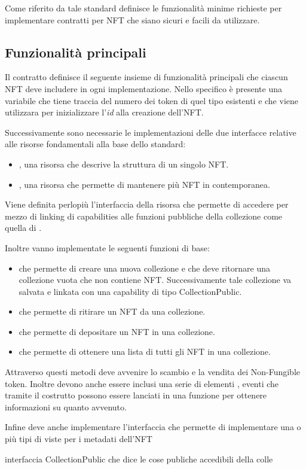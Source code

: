 Come riferito da \cite{web:nft} tale standard definisce le funzionalità minime richieste per implementare contratti per NFT che siano sicuri e facili da utilizzare.

\subsection{Funzionalità principali}
Il contratto definisce il seguente insieme di funzionalità principali che ciascun NFT deve includere in ogni implementazione. Nello specifico è presente una variabile  che tiene traccia del numero dei token di quel tipo esistenti e che viene utilizzara per inizializzare l'\textit{id} alla creazione dell'NFT.

Successivamente sono necessarie le implementazioni delle due interfacce relative alle risorse fondamentali alla base dello standard:
\begin{itemize}
    \item {}, una risorsa che descrive la struttura di un singolo NFT.
    \item {}, una risorsa che permette di mantenere più NFT in contemporanea.
\end{itemize}

Viene definita perlopiù l'interfaccia della risorsa  che permette di accedere per mezzo di linking di capabilities alle funzioni pubbliche della collezione come quella di .

Inoltre vanno implementate le seguenti funzioni di base:
\begin{itemize}
    \item {} che permette di creare una nuova collezione e che deve ritornare una collezione vuota che non contiene NFT. Successivamente tale collezione va salvata e linkata con una capability di tipo CollectionPublic.
    \item {} che permette di ritirare un NFT da una collezione.
    \item {} che permette di depositare un NFT in una collezione.
    \item {} che permette di ottenere una lista di tutti gli NFT in una collezione.
\end{itemize}
Attraverso questi metodi deve avvenire lo scambio e la vendita dei Non-Fungible token. Inoltre devono anche essere inclusi una serie di elementi , eventi che tramite il costrutto  possono essere lanciati in una funzione per ottenere informazioni su quanto avvenuto.

Infine deve anche implementare l'interfaccia   che permette di implementare una o più tipi di viste per i metadati dell'NFT




interfaccia CollectionPublic che dice le cose publiche accedibili della colle